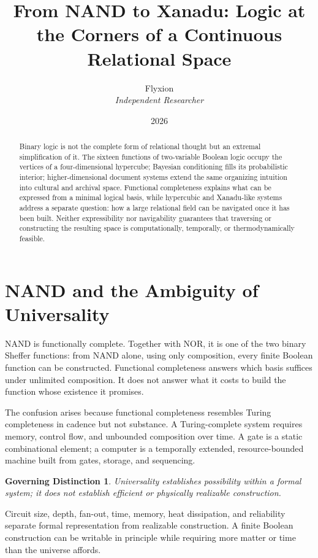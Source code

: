 \documentclass[11pt]{article}
\title{\textbf{From NAND to Xanadu: Logic at the Corners of a Continuous Relational Space}}
\author{Flyxion \\ \textit{Independent Researcher}}
\date{2026}
\newtheorem*{principle}{Governing Distinction}
\begin{document}
\maketitle

\begin{abstract}
\noindent Binary logic is not the complete form of relational thought but an extremal simplification of it. The sixteen functions of two-variable Boolean logic occupy the vertices of a four-dimensional hypercube; Bayesian conditioning fills its probabilistic interior; higher-dimensional document systems extend the same organizing intuition into cultural and archival space. Functional completeness explains what can be expressed from a minimal logical basis, while hypercubic and Xanadu-like systems address a separate question: how a large relational field can be navigated once it has been built. Neither expressibility nor navigability guarantees that traversing or constructing the resulting space is computationally, temporally, or thermodynamically feasible.
\end{abstract}

\section{NAND and the Ambiguity of Universality}

NAND is functionally complete. Together with NOR, it is one of the two binary Sheffer functions: from NAND alone, using only composition, every finite Boolean function can be constructed. Functional completeness answers which basis suffices under unlimited composition. It does not answer what it costs to build the function whose existence it promises.

The confusion arises because functional completeness resembles Turing completeness in cadence but not substance. A Turing-complete system requires memory, control flow, and unbounded composition over time. A gate is a static combinational element; a computer is a temporally extended, resource-bounded machine built from gates, storage, and sequencing.

\begin{principle}
Universality establishes possibility within a formal system; it does not establish efficient or physically realizable construction.
\end{principle}

Circuit size, depth, fan-out, time, memory, heat dissipation, and reliability separate formal representation from realizable construction. A finite Boolean construction can be writable in principle while requiring more matter or time than the universe affords.
\end{document}

